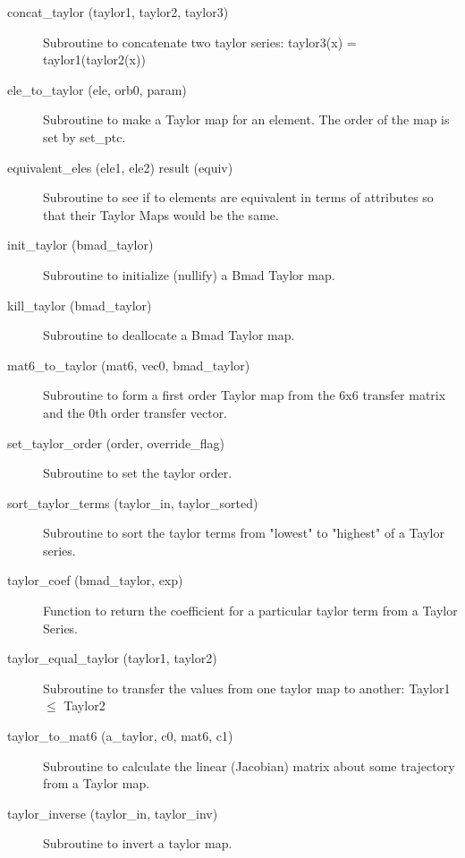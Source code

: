 \begin{description}

\item[concat\_taylor (taylor1, taylor2, taylor3)] \Newline
Subroutine to concatenate two taylor series: taylor3(x) = taylor1(taylor2(x)) 

\item[ele\_to\_taylor (ele, orb0, param)] \Newline
Subroutine to make a Taylor map for an element. The order of the map is set by set\_ptc.

\item[equivalent\_eles (ele1, ele2) result (equiv)] \Newline 
Subroutine to see if to elements are equivalent in terms of attributes so
that their Taylor Maps would be the same. 

\item[init\_taylor (bmad\_taylor)] \Newline
Subroutine to initialize (nullify) a Bmad Taylor map. 

\item[kill\_taylor (bmad\_taylor)] \Newline
Subroutine to deallocate a Bmad Taylor map. 

\item[mat6\_to\_taylor (mat6, vec0, bmad\_taylor)] \Newline
Subroutine to form a first order Taylor map from the 6x6 transfer matrix 
and the 0th order transfer vector. 

\item[set\_taylor\_order (order, override\_flag)] \Newline
Subroutine to set the taylor order. 

\item[sort\_taylor\_terms (taylor\_in, taylor\_sorted)] \Newline
Subroutine to sort the taylor terms from "lowest" to "highest" of a Taylor series. 

\item[taylor\_coef (bmad\_taylor, exp)] \Newline 
Function to return the coefficient for a particular taylor term from a Taylor Series.

\item[taylor\_equal\_taylor (taylor1, taylor2)] \Newline
Subroutine to transfer the values from one taylor map to another: Taylor1 $\le$ Taylor2 

\item[taylor\_to\_mat6 (a\_taylor, c0, mat6, c1)] \Newline
Subroutine to calculate the linear (Jacobian) matrix about some trajectory from a Taylor map. 

\item[taylor\_inverse (taylor\_in, taylor\_inv)] \Newline
Subroutine to invert a taylor map. 


\end{description}
